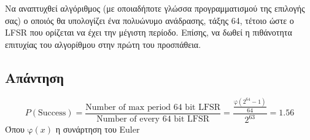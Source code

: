 \documentclass[12pt]{article}
\begin{document}
Να αναπτυχθεί αλγόριθμος (με οποιαδήποτε γλώσσα προγραμματισμού της επιλογής σας) ο 
οποιός θα υπολογίζει ένα πολυώνυμο ανάδρασης, τάξης 64, τέτοιο ώστε ο LFSR που ορίζεται 
να έχει την μέγιστη περίοδο. Επίσης, να δωθεί η πιθάνοτητα επιτυχίας του αλγορίθμου στην πρώτη του προσπάθεια.

\subsection*{Απάντηση}
\[
P(\text{Success}) = \frac{\text{Number of max period 64 bit LFSR}}{\text{Number of every 64 bit LFSR}} = \frac{\frac{\text{φ}(2^{64} - 1)}{64}}{2^{63}} = 1.56%
\]
Όπου \( \text{φ}(x) \) η συνάρτηση του Euler
\hfill \blacksquare
\end{document}
